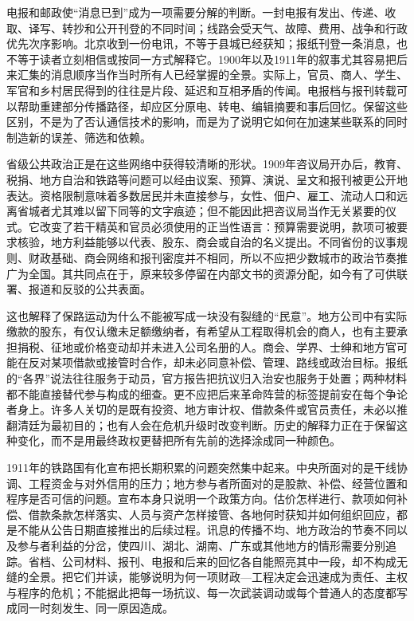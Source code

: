 电报和邮政使“消息已到”成为一项需要分解的判断。一封电报有发出、传递、收取、译写、转抄和公开刊登的不同时间；线路会受天气、故障、费用、战争和行政优先次序影响。北京收到一份电讯，不等于县城已经获知；报纸刊登一条消息，也不等于读者立刻相信或按同一方式解释它。1900年以及1911年的叙事尤其容易把后来汇集的消息顺序当作当时所有人已经掌握的全景。实际上，官员、商人、学生、军官和乡村居民得到的往往是片段、延迟和互相矛盾的传闻。电报档与报刊转载可以帮助重建部分传播路径，却应区分原电、转电、编辑摘要和事后回忆。保留这些区别，不是为了否认通信技术的影响，而是为了说明它如何在加速某些联系的同时制造新的误差、筛选和依赖。

省级公共政治正是在这些网络中获得较清晰的形状。1909年咨议局开办后，教育、税捐、地方自治和铁路等问题可以经由议案、预算、演说、呈文和报刊被更公开地表达。资格限制意味着多数居民并未直接参与，女性、佃户、雇工、流动人口和远离省城者尤其难以留下同等的文字痕迹；但不能因此把咨议局当作无关紧要的仪式。它改变了若干精英和官员必须使用的正当性语言：预算需要说明，款项可被要求核验，地方利益能够以代表、股东、商会或自治的名义提出。不同省份的议事规则、财政基础、商会网络和报刊密度并不相同，所以不应把少数城市的政治节奏推广为全国。其共同点在于，原来较多停留在内部文书的资源分配，如今有了可供联署、报道和反驳的公共表面。

这也解释了保路运动为什么不能被写成一块没有裂缝的“民意”。地方公司中有实际缴款的股东，有仅认缴未足额缴纳者，有希望从工程取得机会的商人，也有主要承担捐税、征地或价格变动却并未进入公司名册的人。商会、学界、士绅和地方官可能在反对某项借款或接管时合作，却未必同意补偿、管理、路线或政治目标。报纸的“各界”说法往往服务于动员，官方报告把抗议归入治安也服务于处置；两种材料都不能直接替代参与构成的细查。更不应把后来革命阵营的标签提前安在每个争论者身上。许多人关切的是既有投资、地方审计权、借款条件或官员责任，未必以推翻清廷为最初目的；也有人会在危机升级时改变判断。历史的解释力正在于保留这种变化，而不是用最终政权更替把所有先前的选择涂成同一种颜色。

1911年的铁路国有化宣布把长期积累的问题突然集中起来。中央所面对的是干线协调、工程资金与对外信用的压力；地方参与者所面对的是股款、补偿、经营位置和程序是否可信的问题。宣布本身只说明一个政策方向。估价怎样进行、款项如何补偿、借款条款怎样落实、人员与资产怎样接管、各地何时获知并如何组织回应，都是不能从公告日期直接推出的后续过程。讯息的传播不均、地方政治的节奏不同以及参与者利益的分岔，使四川、湖北、湖南、广东或其他地方的情形需要分别追踪。省档、公司材料、报刊、电报和后来的回忆各自能照亮其中一段，却不构成无缝的全景。把它们并读，能够说明为何一项财政—工程决定会迅速成为责任、主权与程序的危机；不能据此把每一场抗议、每一次武装调动或每个普通人的态度都写成同一时刻发生、同一原因造成。

